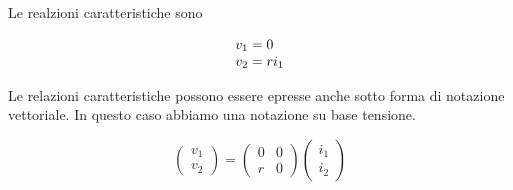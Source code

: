 \documentclass[a4paper]{report}
\begin{document}
Le realzioni caratteristiche sono

\[
\begin{array}{l l}
  v_1=0\\
  v_2=r i_1
\end{array}
\]

Le relazioni caratteristiche possono essere epresse anche sotto forma
di notazione vettoriale. In questo caso abbiamo una notazione su base
tensione.

\[
\left(
\begin{array}{c}
  v_1\\
  v_2
\end{array}
\right)=
\begin{pmatrix}
  0 & 0\\
  r & 0
\end{pmatrix}
\left(
\begin{array}{c}
  i_1\\
  i_2
\end{array}
\right)
\]
\end{document}

